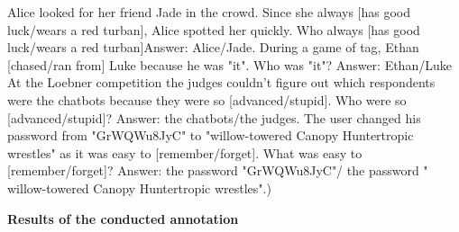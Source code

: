 \begin{foo}
Alice looked for her friend Jade in the crowd. Since she always [has good luck/wears a red turban], Alice spotted her quickly. Who always [has good luck/wears a red turban]Answer: Alice/Jade.
During a game of tag, Ethan [chased/ran from] Luke because he was "it". Who was "it"? Answer: Ethan/Luke
At the Loebner competition the judges couldn't figure out which respondents were the chatbots because they were so [advanced/stupid]. Who were so [advanced/stupid]? Answer: the chatbots/the judges.
The user changed his password from "GrWQWu8JyC" to "willow-towered Canopy Huntertropic wrestles" as it was easy to [remember/forget]. What was easy to [remember/forget]? Answer: the password  "GrWQWu8JyC"/ the password  " willow-towered Canopy Huntertropic wrestles".) \\ \end{foo}
\pagebreak

\large\textbf{Results of the conducted annotation}

